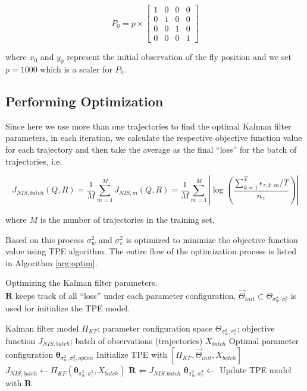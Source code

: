 \begin{equation*}
    P_0 = p \times 
    \left[ 
        \begin{array}{cccc}
          1 & 0 & 0 & 0 \\
          0 & 1 & 0 & 0 \\
          0 & 0 & 1 & 0 \\
          0 & 0 & 0 & 1
        \end{array} 
    \right]
\end{equation*}

where $x_0$ and $y_0$ represent the initial observation of the fly position and we set $p=1000$ which is a scaler for $P_0$.


\subsection{Performing Optimization}

Since here we use more than one trajectories to find the optimal Kalman filter parameters, in each iteration, we calculate the respective objective function value for each trajectory and then take the average as the final ``loss'' for the batch of trajectories, i.e. 

\begin{equation}
    J_{NIS, batch}(Q, R) 
    = \frac{1}{M} \sum_{m=1}^M J_{NIS, m}(Q, R) 
    = \frac{1}{M} \sum_{m=1}^M \left\lvert \log \left(\frac{\sum_{k=1}^T \epsilon_{z, k, m} / T}{n_z}\right)\right\rvert
\end{equation}

where $M$ is the number of trajectories in the training set.

Based on this process $\sigma^2_w$ and $\sigma^2_v$ is optimized to minimize the objective function value using TPE algorithm. 
The entire flow of the optimization process is listed in Algorithm \ref{arg:optim}.

\begin{algorithm}
    \caption{
            Optimizing the Kalman filter parameters. \\
            $\bm{R}$ keeps track of all ``loss'' under each parameter configuration, 
            $\bm{\vec{\varTheta}}_{init} \subset \bm{\varTheta}_{\sigma^2_w, \sigma^2_v}$ is used for initialize the TPE model.
        }
    \label{arg:optim}
    \begin{algorithmic}[1]
        \REQUIRE Kalman filter model $\varPi_{KF}$; parameter configuration space $\bm{\varTheta}_{\sigma^2_w, \sigma^2_v}$; objective function $J_{NIS, batch}$; batch of observations (trajectories) $X_{batch}$
        \ENSURE Optimal parameter configuration $\bm{\theta}_{\sigma^2_w, \sigma^2_v, optim}$
        \STATE Initialize TPE with $[\varPi_{KF}, \bm{\vec{\varTheta}}_{init}, X_{batch}]$
            \STATE $J_{NIS, batch} \leftarrow \varPi_{KF}(\bm{\theta}_{\sigma^2_w, \sigma^2_v}, X_{batch})$
            \STATE $\bm{R} \Leftarrow J_{NIS, batch}$  
            \STATE $\bm{\theta}_{\sigma^2_w, \sigma^2_v} \leftarrow$ Update TPE model with $\bm{R}$
        \ENDWHILE
    \end{algorithmic}
\end{algorithm}

